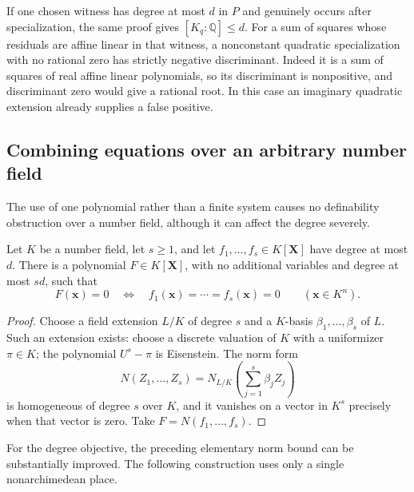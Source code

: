 \begin{remark}
If one chosen witness has degree at most $d$ in $P$ and genuinely occurs
after specialization, the same proof gives $[K_q:\mathbb Q]\leq d$.
For a sum of squares whose residuals are affine linear in that witness,
a nonconstant quadratic specialization with no rational zero has
strictly negative discriminant.  Indeed it is a sum of squares of real
affine linear polynomials, so its discriminant is nonpositive, and
discriminant zero would give a rational root.  In this case an imaginary
quadratic extension already supplies a false positive.
\end{remark}

\subsection{Combining equations over an arbitrary number field}

The use of one polynomial rather than a finite system causes no
definability obstruction over a number field, although it can affect
the degree severely.

\begin{lemma}\label{lem:norm-combine}
Let $K$ be a number field, let $s\geq1$, and let
$f_1,\ldots,f_s\in K[\mathbf X]$ have degree at most $d$.
There is a polynomial $F\in K[\mathbf X]$, with no additional variables
and degree at most $sd$, such that
\[
 F(\mathbf x)=0\quad\Longleftrightarrow\quad
 f_1(\mathbf x)=\cdots=f_s(\mathbf x)=0
 \qquad(\mathbf x\in K^n).
\]
\end{lemma}
\begin{proof}
Choose a field extension $L/K$ of degree $s$ and a $K$-basis
$\beta_1,\ldots,\beta_s$ of $L$.  Such an extension exists: choose a
discrete valuation of $K$ with a uniformizer $\pi\in K$; the polynomial
$U^s-\pi$ is Eisenstein.  The norm form
\[
 N(Z_1,\ldots,Z_s)=
 N_{L/K}\!\left(\sum_{j=1}^s\beta_j Z_j\right)
\]
is homogeneous of degree $s$ over $K$, and it vanishes on a vector in
$K^s$ precisely when that vector is zero.  Take
$F=N(f_1,\ldots,f_s)$.
\end{proof}

For the degree objective, the preceding elementary norm bound can be
substantially improved.  The following construction uses only a single
nonarchimedean place.


